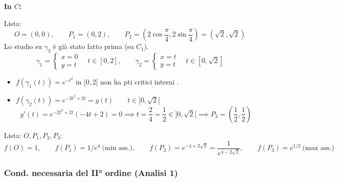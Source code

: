 \begin{esercizio}
\textbf{In $C$:}
\begin{center}
\end{center}
Lista:
\[
O = (0, 0), \qquad P_1 = (0, 2), \qquad P_2 = \left( 2\cos\frac{\pi}{4}, 2\sin\frac{\pi}{4} \right) = (\sqrt{2}, \sqrt{2})
\]
Lo studio su $\gamma_3$ è già stato fatto prima (su $C_1$).
\[
\gamma_1 = \begin{cases} x = 0 \\ y = t \end{cases} \quad t \in [0, 2], \qquad
\gamma_2 = \begin{cases} x = t \\ y = t \end{cases} \quad t \in [0, \sqrt{2}]
\]
\begin{itemize}
    \item $f(\gamma_1(t)) = e^{-t^2}$ in $]0, 2[$ non ha pti critici interni .
    \item $f(\gamma_2(t)) = e^{-2t^2 + 2t} = g(t) \qquad t \in ]0, \sqrt{2}[$
    \[
    g'(t) = e^{-2t^2 + 2t} (-4t + 2) = 0 \implies t = \frac{2}{4} = \frac{1}{2} \in ]0, \sqrt{2}[ \implies P_3 = \left( \frac{1}{2}, \frac{1}{2} \right)
    \]
\end{itemize}
Lista: $O, P_1, P_2, P_3$:
\[
f(O) = 1, \qquad
f(P_1) = 1/e^4 \ \text{(min ass.)}, \qquad
f(P_2) = e^{-4 + 2\sqrt{2}} = \frac{1}{e^{4 - 2\sqrt{2}}}, \qquad
f(P_3) = e^{1/2} \ \text{(max ass.)}
\]
\end{esercizio}

\subsubsection*{Cond. necessaria del II° ordine (Analisi 1)}

